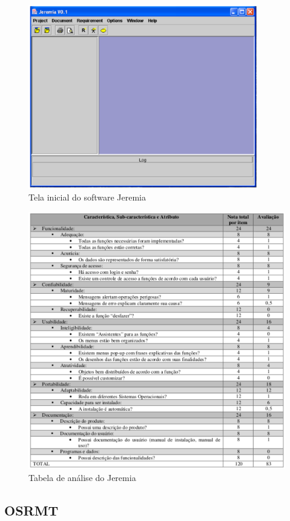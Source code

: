   \begin{figure}[!h]
    \centering
    \includegraphics[width=10cm, keepaspectratio=true]{figuras/ferramentas/jeremia1.eps}
    \caption{Tela inicial do software Jeremia}
  \end{figure}

  \begin{figure}[!h]
    \centering
    \includegraphics[width=12cm, keepaspectratio=true]{figuras/ferramentas/jeremia2.eps}
    \caption{Tabela de análise do Jeremia}
  \end{figure}

\subsection{OSRMT}

